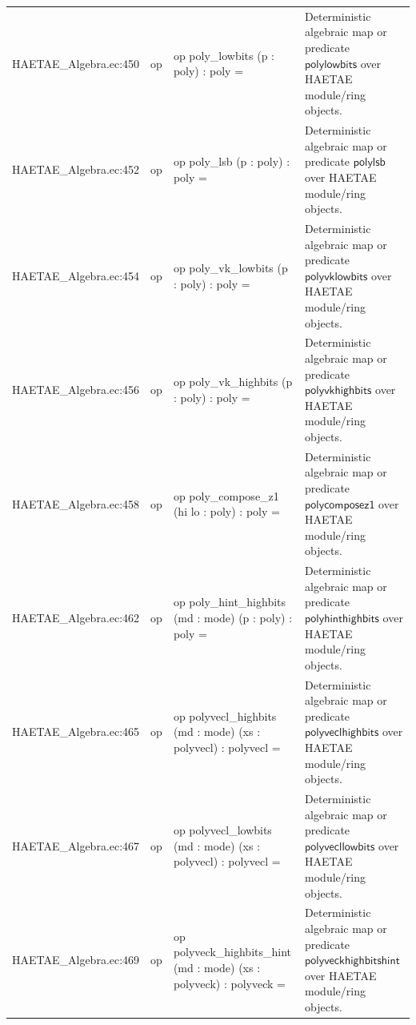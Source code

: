 \documentclass[10pt]{article}
\begin{document}
\begin{longtable}{L{0.11\textwidth}L{0.055\textwidth}L{0.385\textwidth}L{0.41\textwidth}}
HAETAE\_\allowbreak{}Algebra.\allowbreak{}ec:\allowbreak{}450 & op & {\ttfamily\scriptsize op poly\_\allowbreak{}lowbits (p : poly) : poly =} & Deterministic algebraic map or predicate $\mathsf{polylowbits}$ over HAETAE module/ring objects. \\
HAETAE\_\allowbreak{}Algebra.\allowbreak{}ec:\allowbreak{}452 & op & {\ttfamily\scriptsize op poly\_\allowbreak{}lsb (p : poly) : poly =} & Deterministic algebraic map or predicate $\mathsf{polylsb}$ over HAETAE module/ring objects. \\
HAETAE\_\allowbreak{}Algebra.\allowbreak{}ec:\allowbreak{}454 & op & {\ttfamily\scriptsize op poly\_\allowbreak{}vk\_\allowbreak{}lowbits (p : poly) : poly =} & Deterministic algebraic map or predicate $\mathsf{polyvklowbits}$ over HAETAE module/ring objects. \\
HAETAE\_\allowbreak{}Algebra.\allowbreak{}ec:\allowbreak{}456 & op & {\ttfamily\scriptsize op poly\_\allowbreak{}vk\_\allowbreak{}highbits (p : poly) : poly =} & Deterministic algebraic map or predicate $\mathsf{polyvkhighbits}$ over HAETAE module/ring objects. \\
HAETAE\_\allowbreak{}Algebra.\allowbreak{}ec:\allowbreak{}458 & op & {\ttfamily\scriptsize op poly\_\allowbreak{}compose\_\allowbreak{}z1 (hi lo : poly) : poly =} & Deterministic algebraic map or predicate $\mathsf{polycomposez1}$ over HAETAE module/ring objects. \\
HAETAE\_\allowbreak{}Algebra.\allowbreak{}ec:\allowbreak{}462 & op & {\ttfamily\scriptsize op poly\_\allowbreak{}hint\_\allowbreak{}highbits (md : mode) (p : poly) : poly =} & Deterministic algebraic map or predicate $\mathsf{polyhinthighbits}$ over HAETAE module/ring objects. \\
HAETAE\_\allowbreak{}Algebra.\allowbreak{}ec:\allowbreak{}465 & op & {\ttfamily\scriptsize op polyvecl\_\allowbreak{}highbits (md : mode) (xs : polyvecl) : polyvecl =} & Deterministic algebraic map or predicate $\mathsf{polyveclhighbits}$ over HAETAE module/ring objects. \\
HAETAE\_\allowbreak{}Algebra.\allowbreak{}ec:\allowbreak{}467 & op & {\ttfamily\scriptsize op polyvecl\_\allowbreak{}lowbits (md : mode) (xs : polyvecl) : polyvecl =} & Deterministic algebraic map or predicate $\mathsf{polyvecllowbits}$ over HAETAE module/ring objects. \\
HAETAE\_\allowbreak{}Algebra.\allowbreak{}ec:\allowbreak{}469 & op & {\ttfamily\scriptsize op polyveck\_\allowbreak{}highbits\_\allowbreak{}hint (md : mode) (xs : polyveck) : polyveck =} & Deterministic algebraic map or predicate $\mathsf{polyveckhighbitshint}$ over HAETAE module/ring objects. \\

\end{longtable}
\end{document}
